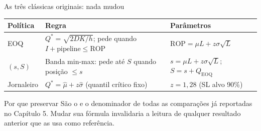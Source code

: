 \begin{frame}{As três clássicas originais: nada mudou}
  \centering
  \tabstyle\footnotesize
  \begin{tabular}{@{}lll@{}}
    \toprule
    \textbf{Política} & \textbf{Regra} & \textbf{Parâmetros} \\
    \midrule
    EOQ & $Q^\ast=\sqrt{2D K/h}$; pede quando $I{+}\text{pipeline}\leq \mathrm{ROP}$ &
      $\mathrm{ROP}=\mu L + z\sigma\sqrt{L}$ \\
    $(s,S)$ & Banda min-max: pede até $S$ quando posição $\leq s$ &
      $s=\mu L{+}z\sigma\sqrt{L}$; $S=s{+}Q_{\mathrm{EOQ}}$ \\
    Jornaleiro & $Q^\ast=\hat\mu+z\hat\sigma$ (quantil crítico fixo) &
      $z=1{,}28$ (SL alvo 90\%) \\
    \bottomrule
  \end{tabular}
  \vspace{1em}

  \begin{block}{Por que preservar}
    \small São o  e o denominador de todas as
    comparações já reportadas no Capítulo 5. Mudar sua fórmula invalidaria
    a leitura de qualquer resultado anterior que as usa como referência.
  \end{block}

\end{frame}
